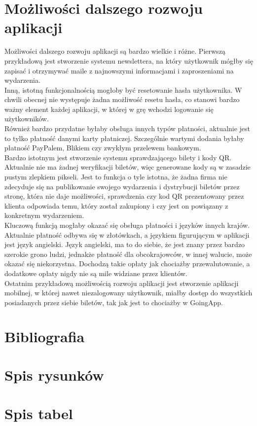 \documentclass[12pt]{article}
\begin{document}
\begin{sloppypar}
\section{Możliwości dalszego rozwoju aplikacji}
{
  Możliwości dalszego rozwoju aplikacji są bardzo wielkie i różne. 
  Pierwszą przykładową jest stworzenie systemu newslettera, na który użytkownik mógłby się zapisać i otrzymywać maile z najnowszymi informacjami i zaproszeniami na wydarzenia.\\ 
  Inną, istotną funkcjonalnością mogłoby być resetowanie hasła użytkownika. W chwili obecnej nie występuje żadna możliwość resetu hasła, co stanowi bardzo ważny element 
  każdej aplikacji, w której w grę wchodzi logowanie się użytkowników.\\
  Również bardzo przydatne byłaby obsługa innych typów płatności, aktualnie jest to tylko płatność danymi karty płatniczej. 
  Szczególnie wartymi dodania byłaby płatność PayPalem, Blikiem czy zwykłym przelewem bankowym.\\
  Bardzo istotnym jest stworzenie systemu sprawdzającego bilety i kody QR. 
  Aktualnie nie ma żadnej weryfikacji biletów, więc generowane kody są w zasadzie pustym zlepkiem pikseli. 
  Jest to funkcja o tyle istotna, że żadna firma nie zdecyduje się na publikowanie swojego wydarzenia i dystrybucji biletów przez stronę, która nie daje możliwości, 
  sprawdzenia czy kod QR prezentowany przez klienta odpowiada temu, który został zakupiony i czy jest on powiązany z konkretnym wydarzeniem.\\
  Kluczową funkcją mogłaby okazać się obsługa płatności i języków innych krajów. 
  Aktualnie płatność odbywa się w złotówkach, a językiem figurującym w aplikacji jest język angielski. 
  Język angielski, ma to do siebie, że jest znany przez bardzo szerokie grono ludzi, jednakże płatność dla obcokrajowców, w innej walucie, może okazać się niekorzystna.
  Dochodzą takie opłaty jak chociażby przewalutowanie, a dodatkowe opłaty nigdy nie są mile widziane przez klientów.\\
  Ostatnim przykładową możliwością rozwoju aplikacji jest stworzenie aplikacji mobilnej, w której nawet niezalogowany użytkownik, 
  miałby dostęp do wszystkich posiadanych przez siebie biletów, tak jak jest to chociażby w GoingApp.
}

\section{Bibliografia}
{
  \printbibliography
}

\section{Spis rysunków}
{
  \listoffigures
}

\section{Spis tabel}
{
  \listoftables
}

\end{sloppypar}
\end{document}
